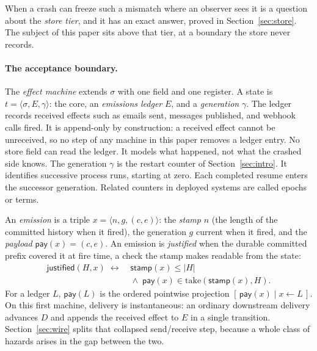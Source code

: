 \documentclass[sigplan,10pt]{acmart}
\theoremstyle{plain}
\theoremstyle{definition}
\newcommand{\pay}{\mathsf{pay}}            %
\newcommand{\stampf}{\mathsf{stamp}}       %
\newcommand{\just}{\mathsf{justified}}
\begin{document}
When a crash can freeze such a mismatch where an observer sees it is a
question about the \emph{store tier}, and it has an exact answer,
proved in Section~\ref{sec:store}. The subject of this paper sits
above that tier, at a boundary the store never records.

\paragraph{The acceptance boundary.}
The \emph{effect machine} extends $\sigma$ with one field and one
register. A state is $t = \langle \sigma, E, \gamma \rangle$: the core,
an \emph{emissions ledger} $E$, and a \emph{generation} $\gamma$. The
ledger records received effects such as emails sent, messages
published, and webhook calls fired. It is
append-only by construction: a received effect cannot be unreceived,
so no step of any machine in this paper removes a ledger entry. No
store field can read the ledger. It models what happened,
not what the crashed side knows. The generation $\gamma$ is the restart counter of
Section~\ref{sec:intro}. It identifies successive process runs, starting at zero. Each completed resume enters
the successor generation. Related counters in deployed systems are called
epochs or terms.

An \emph{emission} is a triple $x = \langle n, g, (c,e) \rangle$: the
\emph{stamp} $n$ (the length of the committed history when it
fired), the generation $g$ current when it fired, and the \emph{payload}
$\pay(x) = (c,e)$. An emission is \emph{justified} when the durable
committed prefix covered it at fire time, a check the stamp makes
readable from the state:
\[
  \begin{aligned}
  \just(H, x) \;\longleftrightarrow\;&
    \stampf(x) \le |H|\\[-2pt]
  &{}\wedge\; \pay(x) \in \mathrm{take}(\stampf(x), H).
  \end{aligned}
\]
For a ledger $L$, $\pay(L)$ is the ordered pointwise projection
$[\,\pay(x)\mid x\leftarrow L\,]$. On this first machine, delivery is
instantaneous: an ordinary downstream delivery advances $D$ and appends
the received effect to $E$ in a single transition. Section~\ref{sec:wire} splits
that collapsed send/receive step, because a whole class of hazards
arises in the gap between the two.
\end{document}
